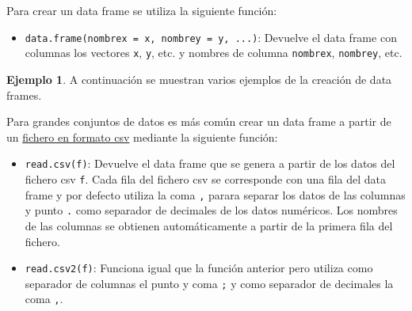 \documentclass[
]{book}
\newenvironment{Shaded}{\begin{snugshade}}{\end{snugshade}}
\newcommand{\AttributeTok}[1]{\textcolor[rgb]{0.77,0.63,0.00}{#1}}
\newcommand{\CommentTok}[1]{\textcolor[rgb]{0.56,0.35,0.01}{\textit{#1}}}
\newcommand{\DecValTok}[1]{\textcolor[rgb]{0.00,0.00,0.81}{#1}}
\newcommand{\FloatTok}[1]{\textcolor[rgb]{0.00,0.00,0.81}{#1}}
\newcommand{\FunctionTok}[1]{\textcolor[rgb]{0.00,0.00,0.00}{#1}}
\newcommand{\NormalTok}[1]{#1}
\newcommand{\OtherTok}[1]{\textcolor[rgb]{0.56,0.35,0.01}{#1}}
\newcommand{\StringTok}[1]{\textcolor[rgb]{0.31,0.60,0.02}{#1}}
\providecommand{\tightlist}{%
  \setlength{\itemsep}{0pt}\setlength{\parskip}{0pt}}
\theoremstyle{definition}
\theoremstyle{definition}
\newtheorem{example}{Ejemplo}[chapter]
\theoremstyle{definition}
\theoremstyle{definition}
\theoremstyle{remark}
\begin{document}
Para crear un data frame se utiliza la siguiente función:

\begin{itemize}
\tightlist
\item
  \texttt{data.frame(nombrex\ =\ x,\ nombrey\ =\ y,\ ...)}: Devuelve el data frame con columnas los vectores \texttt{x}, \texttt{y}, etc. y nombres de columna \texttt{nombrex}, \texttt{nombrey}, etc.
\end{itemize}

\begin{example}

A continuación se muestran varios ejemplos de la creación de data frames.

\begin{Shaded}
\end{Shaded}

\end{example}

Para grandes conjuntos de datos es más común crear un data frame a partir de un \href{https://es.wikipedia.org/wiki/Valores_separados_por_comas}{fichero en formato csv} mediante la siguiente función:

\begin{itemize}
\tightlist
\item
  \texttt{read.csv(f)}: Devuelve el data frame que se genera a partir de los datos del fichero csv \texttt{f}. Cada fila del fichero csv se corresponde con una fila del data frame y por defecto utiliza la coma \texttt{,} parara separar los datos de las columnas y punto \texttt{.} como separador de decimales de los datos numéricos. Los nombres de las columnas se obtienen automáticamente a partir de la primera fila del fichero.
\item
  \texttt{read.csv2(f)}: Funciona igual que la función anterior pero utiliza como separador de columnas el punto y coma \texttt{;} y como separador de decimales la coma \texttt{,}.
\end{itemize}
\end{document}
